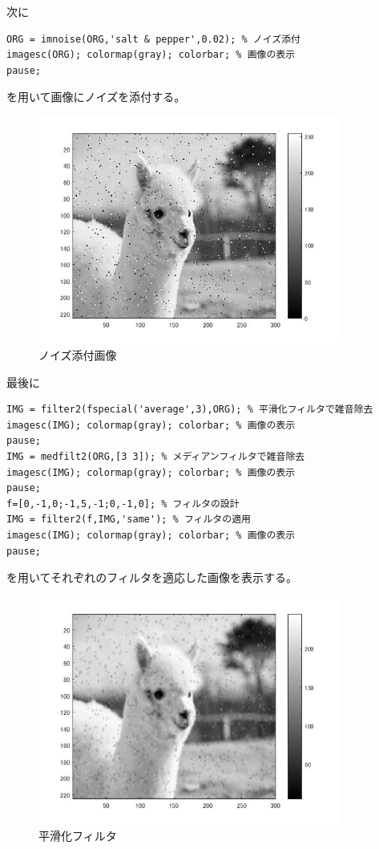 \documentclass{jsarticle}
\begin{document}
次に
\begin{lstlisting}[basicstyle=\ttfamily\footnotesize, frame=single]
ORG = imnoise(ORG,'salt & pepper',0.02); % ノイズ添付
imagesc(ORG); colormap(gray); colorbar; % 画像の表示
pause;
 \end{lstlisting}
を用いて画像にノイズを添付する。

\newpage
\begin{figure}[htbp]
 \begin{center}
  \includegraphics[width=10cm]{8-1.jpg}
 \end{center}
 \caption{ノイズ添付画像}
\end{figure}

最後に
\begin{lstlisting}[basicstyle=\ttfamily\footnotesize, frame=single]
IMG = filter2(fspecial('average',3),ORG); % 平滑化フィルタで雑音除去
imagesc(IMG); colormap(gray); colorbar; % 画像の表示
pause;
IMG = medfilt2(ORG,[3 3]); % メディアンフィルタで雑音除去
imagesc(IMG); colormap(gray); colorbar; % 画像の表示
pause;
f=[0,-1,0;-1,5,-1;0,-1,0]; % フィルタの設計
IMG = filter2(f,IMG,'same'); % フィルタの適用
imagesc(IMG); colormap(gray); colorbar; % 画像の表示
pause;
 \end{lstlisting}
を用いてそれぞれのフィルタを適応した画像を表示する。

\newpage
\begin{figure}[htbp]
 \begin{center}
  \includegraphics[width=10cm]{8-2.jpg}
 \end{center}
 \caption{平滑化フィルタ}
\end{figure}
\end{document}
